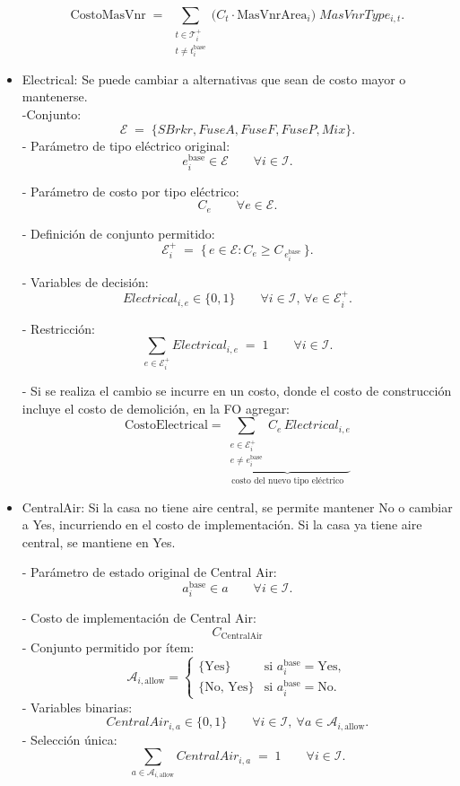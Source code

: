 \begin{itemize}
\[
\text{CostoMasVnr}
\;=\;
\sum_{\substack{t \in \mathcal{T}^+_i \\ t \neq t_i^{\text{base}}}}
\Big( C_t \cdot \mathrm{MasVnrArea}_i \Big)\; MasVnrType_{i,t}.
\]

 \item Electrical: Se puede cambiar a alternativas que sean de costo mayor o mantenerse.\\
    -Conjunto:
    \[
      \mathcal{E} \;=\; \{SBrkr, FuseA, FuseF, FuseP, Mix\}.
    \]
    - Parámetro de tipo eléctrico original:
    \[
      e_i^{\text{base}} \in  \mathcal{E}\qquad \forall i \in \mathcal{I}.
    \]
    
    - Parámetro de costo por tipo eléctrico:
    \[
      C_e \qquad \forall e \in \mathcal{E}.
    \]

    - Definición de conjunto permitido:
    \[
      \mathcal{E}^+_i \;=\; \{\, e \in \mathcal{E} : C_e \ge C_{\,e_i^{\text{base}}} \,\}.
    \]

    - Variables de decisión:
    \[
      Electrical_{i,e} \in \{0,1\} \qquad \forall i \in \mathcal{I},\, \forall e \in \mathcal{E}^+_i.
    \]

    - Restricción:
    \[
      \sum_{e \in \mathcal{E}^+_i} Electrical_{i,e} \;=\; 1
      \qquad \forall i \in \mathcal{I}.
    \]
  
     - Si se realiza el cambio se incurre en un costo, donde el costo de construcción incluye el costo de demolición, en la FO agregar:
    \[
\text{CostoElectrical}
=
\underbrace{\sum_{\substack{e \in \mathcal{E}^+_i \\ e \neq e_i^{\text{base}}}}
C_e\, Electrical_{i,e}}_{\text{costo del nuevo tipo eléctrico}}
\]

\item CentralAir: Si la casa no tiene aire central, se permite mantener No o cambiar a Yes, incurriendo en el costo de implementación. Si la casa ya tiene aire central, se mantiene en Yes.

    - Parámetro de estado original de Central Air:
    \[
      a_i^{\text{base}} \in a \qquad \forall i \in \mathcal{I}.
    \]

    - Costo de implementación de Central Air:
    \[
      C_{\text{CentralAir}}
    \]
    - Conjunto permitido por ítem:
    \[
      \mathcal{A}_{i,\text{allow}} =
      \begin{cases}
        \{\text{Yes}\} & \text{si } a_i^{\text{base}} = \text{Yes},\\[3pt]
        \{\text{No},\, \text{Yes}\} & \text{si } a_i^{\text{base}} = \text{No}.
      \end{cases}
    \]
    - Variables binarias:
    \[
      CentralAir_{i,a} \in \{0,1\}
      \qquad \forall i \in \mathcal{I},\ \forall a \in \mathcal{A}_{i,\text{allow}}.
    \]
    - Selección única:
    \[
      \sum_{a \in \mathcal{A}_{i,\text{allow}}} CentralAir_{i,a} \;=\; 1
      \qquad \forall i \in \mathcal{I}.
    \]


\end{itemize}
